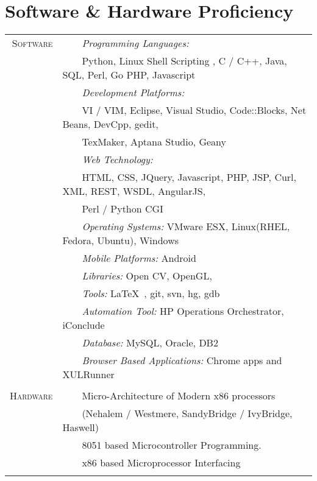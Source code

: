 \documentclass[a4paper,10pt]{article} %
\newcommand{\tabitem}{~~\llap{\textbullet}~~}
\begin{document}
\newpage

\section{Software \& Hardware Proficiency}
\begin{tabular}{rl}
\textsc{Software} &  
\tabitem \textit{Programming Languages:}\\
& ~~~~Python, Linux Shell Scripting , C / C++, Java, SQL, Perl, Go PHP, Javascript \\
& \tabitem \textit{Development Platforms:} \\
& ~~~~VI / VIM, Eclipse, Visual Studio, Code::Blocks, Net Beans, DevCpp, gedit,\\
& ~~~~TexMaker, Aptana Studio, Geany\\	
& \tabitem \textit{Web Technology:} \\
& ~~~~HTML, CSS, JQuery, Javascript, PHP, JSP, Curl, XML, REST, WSDL, AngularJS,\\
& ~~~~Perl / Python CGI\\
& \tabitem \textit{Operating Systems:} VMware ESX, Linux(RHEL, Fedora, Ubuntu), Windows \\
& \tabitem \textit{Mobile Platforms:} Android \\
& \tabitem \textit{Libraries:} Open CV, OpenGL,  \\
& \tabitem \textit{Tools:} \LaTeX\ , git, svn, hg, gdb\\
& \tabitem \textit{Automation Tool:} HP Operations Orchestrator, iConclude \\
& \tabitem \textit{Database:} MySQL, Oracle, DB2 \\
& \tabitem \textit{Browser Based Applications:} Chrome apps and XULRunner \\

&\\

\textsc{Hardware}  & \tabitem Micro-Architecture of Modern x86 processors\\
& ~~~~(Nehalem / Westmere, SandyBridge / IvyBridge, Haswell) \\ 
& \tabitem 8051 based Microcontroller Programming. \\
& \tabitem x86 based Microprocessor Interfacing \\
&\\
\end{tabular}
\end{document}
